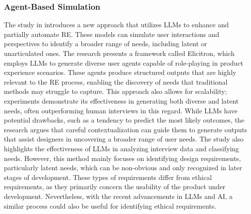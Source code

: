 \subsubsection{Agent-Based Simulation}
The study in \cite{ataei2024elicitron} introduces a new approach that utilizes LLMs to enhance and partially automate RE. These models can 
simulate user interactions and perspectives to identify a broader range of needs, including latent or unarticulated ones.
The research presents a framework called Elicitron, which employs LLMs to generate diverse user agents capable of role-playing in product experience scenarios. These agents produce structured 
outputs that are highly relevant to the RE process, enabling the discovery of needs that traditional methods may struggle to capture. This approach also allows for scalability; experiments 
demonstrate its effectiveness in generating both diverse and latent needs, often outperforming human interviews in this regard.
While LLMs have potential drawbacks, such as a tendency to predict the most likely outcomes, the research argues that careful contextualization can guide them to generate outputs that assist 
designers in uncovering a broader range of user needs. The study also highlights the effectiveness of LLMs in analyzing interview data and classifying needs.
However, this method mainly focuses on identifying design requirements, particularly latent needs, which can be non-obvious and only recognized in later stages of development. These types of 
requirements differ from ethical requirements, as they primarily concern the usability of the product under development. Nevertheless, with the recent advancements in LLMs and AI, a similar 
process could also be useful for identifying ethical requirements.

